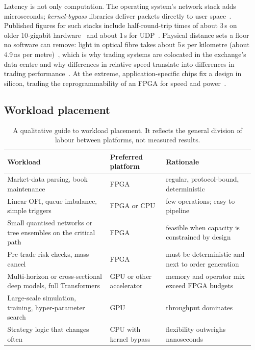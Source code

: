 Latency is not only computation. The operating system's network stack adds microseconds;
\emph{kernel-bypass} libraries deliver packets directly to user space~\citep{dpdk}. Published figures for
such stacks include half-round-trip times of about 3\,\textmu s on older 10-gigabit
hardware~\citep{openonload} and about 1\,\textmu s for UDP~\citep{vma}. Physical distance sets a floor no
software can remove: light in optical fibre takes about 5\,\textmu s per kilometre (about 4.9\,ns per
metre)~\citep{corning_smf28,fiberlatency}, which is why trading systems are colocated in the
exchange's data centre and why differences in relative speed translate into differences in trading
performance~\citep{baron2019,budish2015}. At the extreme, application-specific chips fix a design in
silicon, trading the reprogrammability of an FPGA for speed and power~\citep{kuon2007}.

\subsection{Workload placement}

\begin{table}[!htbp]
\centering\small
\caption{A qualitative guide to workload placement. It reflects the general division of labour
between platforms, not measured results.}
\label{tab:placement}
\begin{tabularx}{\linewidth}{lXX}
\toprule
Workload & Preferred platform & Rationale \\
\midrule
Market-data parsing, book maintenance & FPGA & regular, protocol-bound, deterministic \\
Linear OFI, queue imbalance, simple triggers & FPGA or CPU & few operations; easy to pipeline \\
Small quantised networks or tree ensembles on the critical path & FPGA & feasible when capacity is
  constrained by design \\
Pre-trade risk checks, mass cancel & FPGA & must be deterministic and next to order generation \\
Multi-horizon or cross-sectional deep models, full Transformers & GPU or other accelerator &
  memory and operator mix exceed FPGA budgets \\
Large-scale simulation, training, hyper-parameter search & GPU & throughput dominates \\
Strategy logic that changes often & CPU with kernel bypass & flexibility outweighs nanoseconds \\
\bottomrule
\end{tabularx}
\end{table}

